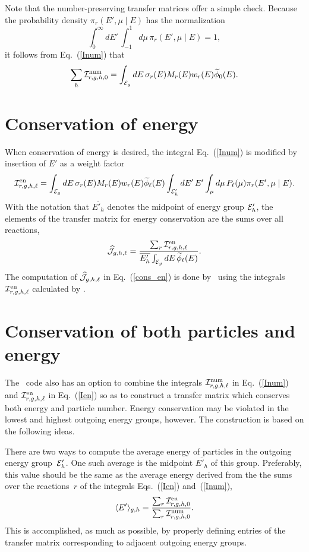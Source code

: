 Note that the number-preserving transfer matrices offer a
simple check.  Because the probability density
$\pi_r(E', \mu \mid E)$ has the normalization
$$
  \int_0^\infty dE' \, \int_{-1}^1 d\mu \, 
     \pi_r(E', \mu \mid E) = 1,
$$
it follows from Eq.~(\ref{Inum}) that
\begin{equation}
  \sum_h {\cal I}^{\text{num}}_{r,g,h,0} =
    \int_{{\cal E}_g} dE \, \sigma_r ( E ) M_r(E) w_r(E) \widetilde \phi_0(E).
  \label{rowSum}
\end{equation}

\section{Conservation of energy}
When conservation of energy is desired, the integral
Eq.~(\ref{Inum}) is modified by insertion of $E'$ as a weight factor
\begin{equation}
  {\cal I}^{\text{en}}_{r,g,h,\ell} =
     \int_{{\cal E}_g} dE \, \sigma_r ( E ) M_r(E) w_r(E) \widetilde \phi_\ell(E) 
    \int_{{\cal E}'_h } dE' \, E' \int_\mu d\mu  \, 
     P_\ell ( \mu )
     \pi_r(E', \mu \mid E).
  \label{Ien}
\end{equation}
With the notation that $\overline {E'_h}$ denotes the midpoint of
energy group ${\cal E}'_h$, the elements of the transfer matrix
for energy conservation are the sums over all reactions,
\begin{equation}
  \widehat {{\cal J}}_{g,h,\ell} = \frac{ \sum_r {\cal I}^{\text{en}}_{r,g,h,\ell} }
       { \overline {E'_h} \int_{{\cal E}_g} dE \, \widetilde \phi_\ell(E) }.
  \label{cons_en}
\end{equation}
The computation of $\widehat {{\cal J}}_{g,h,\ell}$ in Eq.~(\ref{cons_en})
is done by \xndfgen\ using the integrals ${\cal I}^{\text{en}}_{r,g,h,\ell} $ calculated
by \gettransfer.

\section{Conservation of both particles and energy}
The \xndfgen\ code also has an option to combine the 
integrals ${\cal I}^{\text{num}}_{r,g,h,\ell}$ in Eq.~(\ref{Inum}) and ${\cal I}^{\text{en}}_{r,g,h,\ell}$ in Eq.~(\ref{Ien})
so as to construct a transfer matrix which conserves both energy
and particle number.  Energy conservation may be violated
in the lowest and highest outgoing energy groups, however.
The construction is based on the following ideas.

There are two ways to compute the average energy of particles
in the outgoing energy group~${\cal E}'_h$.  One such average is the midpoint
$\overline {E'_h}$ of this group.  Preferably, this value should be
the same as the average energy
derived from the the sums over the reactions~$r$ of the
integrals Eqs.~(\ref{Ien}) and~(\ref{Inum}),
\begin{equation}
  \langle E' \rangle_{g,h} =
  \frac{ \sum_r {\cal I}^{\text{en}}_{r,g,h,0}}{ \sum_r {\cal I}^{\text{num}}_{r,g,h,0}}.
  \label{av_E}
\end{equation}
This is accomplished, as much as possible, by properly defining
entries of the transfer matrix corresponding to adjacent outgoing
energy groups.

